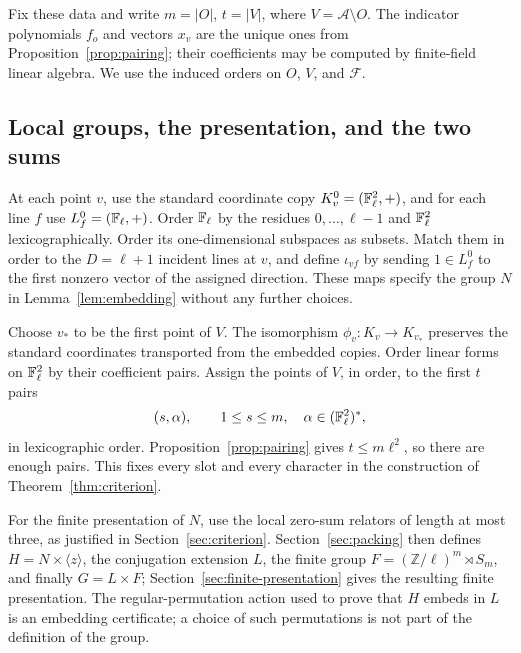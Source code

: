 Fix these data and write $m=|O|$, $t=|V|$, where $V=\mathcal A\setminus O$. The indicator polynomials $f_o$ and vectors $x_v$ are the unique ones from Proposition~\ref{prop:pairing}; their coefficients may be computed by finite-field linear algebra. We use the induced orders on $O$, $V$, and $\mathcal F$.

\subsection{Local groups, the presentation, and the two sums}

At each point $v$, use the standard coordinate copy $K_v^0=(\mathbb F_\ell^2,+)$, and for each line $f$ use $L_f^0=(\mathbb F_\ell,+)$. Order $\mathbb F_\ell$ by the residues $0,\ldots,\ell-1$ and $\mathbb F_\ell^2$ lexicographically. Order its one-dimensional subspaces as subsets. Match them in order to the $D=\ell+1$ incident lines at $v$, and define $\iota_{vf}$ by sending $1\in L_f^0$ to the first nonzero vector of the assigned direction. These maps specify the group $N$ in Lemma~\ref{lem:embedding} without any further choices.

Choose $v_*$ to be the first point of $V$. The isomorphism $\phi_v:K_v\to K_{v_*}$ preserves the standard coordinates transported from the embedded copies. Order linear forms on $\mathbb F_\ell^2$ by their coefficient pairs. Assign the points of $V$, in order, to the first $t$ pairs
\[
(s,\alpha),\qquad 1\le s\le m,\quad \alpha\in(\mathbb F_\ell^2)^*,
\]
in lexicographic order. Proposition~\ref{prop:pairing} gives $t\le m\ell^2$, so there are enough pairs. This fixes every slot and every character in the construction of Theorem~\ref{thm:criterion}.

For the finite presentation of $N$, use the local zero-sum relators of length at most three, as justified in Section~\ref{sec:criterion}. Section~\ref{sec:packing} then defines $H=N\times\langle z\rangle$, the conjugation extension $L$, the finite group $F=(\mathbb Z/\ell)^m\rtimes S_m$, and finally $G=L\times F$; Section~\ref{sec:finite-presentation} gives the resulting finite presentation. The regular-permutation action used to prove that $H$ embeds in $L$ is an embedding certificate; a choice of such permutations is not part of the definition of the group.

